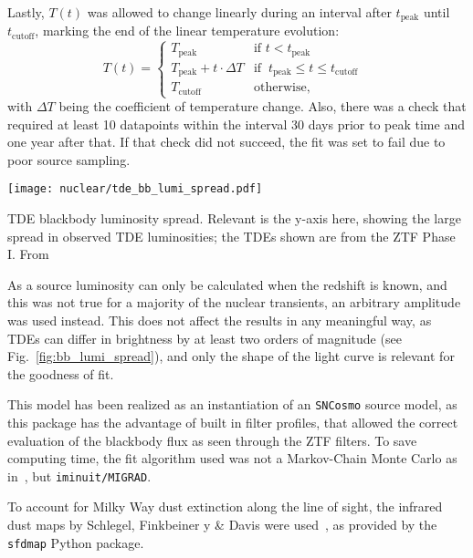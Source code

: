 Lastly, $T(t)$ was allowed to change linearly during an interval after $t_\text{peak}$ until $t_\text{cutoff}$, marking the end of the linear temperature evolution:
\begin{equation}
    T(t) = \begin{cases}
        T_\text{peak}                    & \text{if $t<t_\text{peak}$}                              \\
        T_\text{peak} + t \cdot \Delta T & \text{if $~t_\text{peak} \leq t \leq t_\text{cutoff} $ } \\
        T_\text{cutoff}                  & \text{otherwise},
    \end{cases}
\end{equation}
with $\Delta T$ being the coefficient of temperature change. Also, there was a check that required at least 10 datapoints within the interval 30 days prior to peak time and one year after that. If that check did not succeed, the fit was set to fail due to poor source sampling.

\begin{marginfigure}
    \texttt{[image: nuclear/tde\_bb\_lumi\_spread.pdf]}
    \caption[TDE blackbody luminosity spread]{TDE blackbody luminosity spread. Relevant is the y-axis here, showing the large spread in observed TDE luminosities; the TDEs shown are from the ZTF Phase I. From~\cite{Hammerstein2022}}
\end{marginfigure}

As a source luminosity can only be calculated when the redshift is known, and this was not true for a majority of the nuclear transients, an arbitrary amplitude was used instead. This does not affect the results in any meaningful way, as TDEs can differ in brightness by at least two orders of magnitude (see Fig.~\ref{fig:bb_lumi_spread}), and only the shape of the light curve is relevant for the goodness of fit.\cite{Hammerstein2022}

This model has been realized as an instantiation of an \texttt{SNCosmo} source model, as this package has the advantage of built in filter profiles, that allowed the correct evaluation of the blackbody flux as seen through the ZTF filters. To save computing time, the fit algorithm used was not a Markov-Chain Monte Carlo as in~\cite{Velzen2021a}, but \texttt{iminuit/MIGRAD}.

To account for Milky Way dust extinction along the line of sight, the infrared dust maps by Schlegel, Finkbeiner y \& Davis were used~, as provided by the \texttt{sfdmap} Python package.

